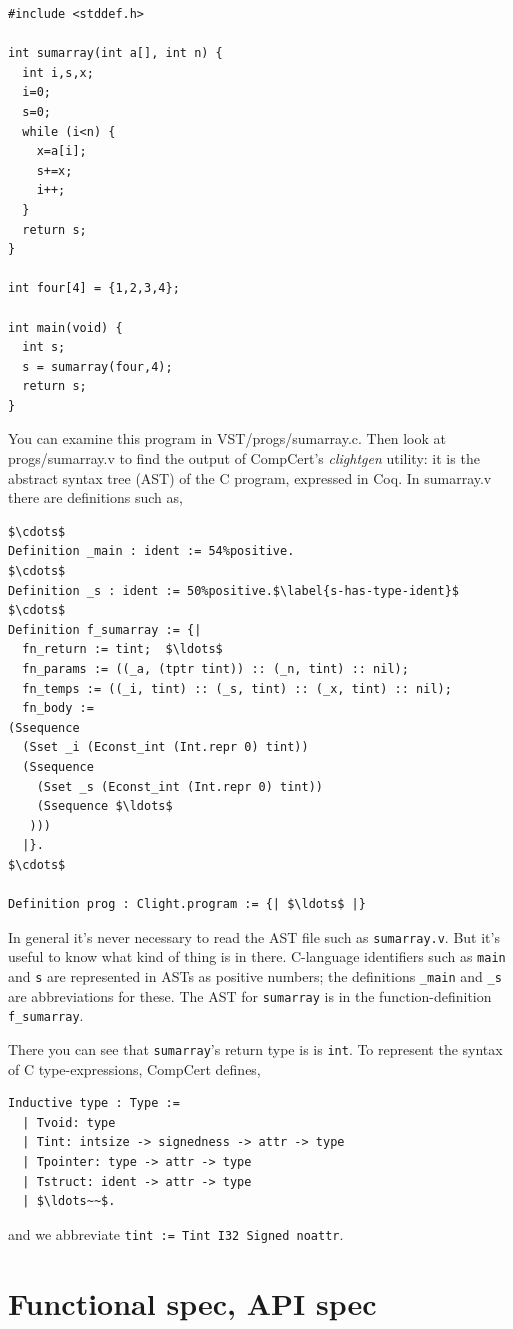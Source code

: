 \documentclass[12pt,fleqn,openany,oneside,showtrims]{memoir}
\begin{document}
\begin{lstlisting}
#include <stddef.h>

int sumarray(int a[], int n) {
  int i,s,x;
  i=0;
  s=0;
  while (i<n) {
    x=a[i];
    s+=x;
    i++;
  }
  return s;
}

int four[4] = {1,2,3,4};

int main(void) {
  int s;
  s = sumarray(four,4);
  return s;
}
\end{lstlisting}

You can examine this program in VST/progs/sumarray.c.
Then look at progs/sumarray.v to find the output
of CompCert's \emph{clightgen} utility:  it is the
abstract syntax tree (AST) of the C program, expressed in Coq.
In sumarray.v there are definitions such as,
\begin{lstlisting}
$\cdots$
Definition _main : ident := 54%positive.
$\cdots$
Definition _s : ident := 50%positive.$\label{s-has-type-ident}$
$\cdots$
Definition f_sumarray := {|
  fn_return := tint;  $\ldots$
  fn_params := ((_a, (tptr tint)) :: (_n, tint) :: nil);
  fn_temps := ((_i, tint) :: (_s, tint) :: (_x, tint) :: nil);
  fn_body :=
(Ssequence
  (Sset _i (Econst_int (Int.repr 0) tint))
  (Ssequence
    (Sset _s (Econst_int (Int.repr 0) tint))
    (Ssequence $\ldots$ 
   )))
  |}.
$\cdots$

Definition prog : Clight.program := {| $\ldots$ |}
\end{lstlisting}

In general it's never necessary to read the AST file such as
\lstinline{sumarray.v}.  But it's useful to know what kind of thing
is in there. C-language identifiers such as \lstinline{main} and \lstinline{s}
are represented in ASTs as positive numbers; the definitions
\lstinline{_main} and \lstinline{_s} are abbreviations for these.
The AST for \lstinline{sumarray} is in the function-definition
\lstinline{f_sumarray}.

There you can see that \lstinline{sumarray}'s return type is
is \lstinline{int}.  To represent the syntax of C type-expressions,
CompCert defines,
\begin{lstlisting}
Inductive type : Type :=
  | Tvoid: type   
  | Tint: intsize -> signedness -> attr -> type
  | Tpointer: type -> attr -> type
  | Tstruct: ident -> attr -> type
  | $\ldots~~$.
\end{lstlisting}
and we abbreviate \lstinline{tint := Tint I32 Signed noattr}.

\chapter{Functional spec, API spec}
\end{document}
